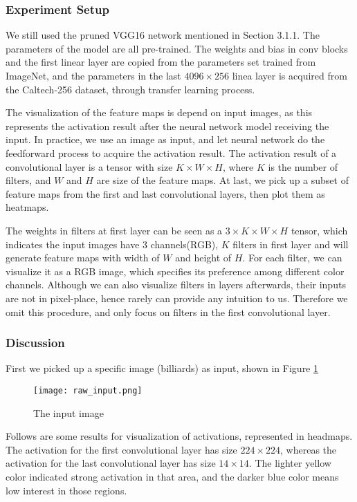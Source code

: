 \subsubsection{Experiment Setup}
We still used the pruned VGG16 network mentioned in Section 3.1.1. The parameters of the model are all pre-trained. The weights and bias in conv blocks and the first linear layer are copied from the parameters set trained from ImageNet, and the parameters in the last $4096\times 256$ linea layer is acquired from the Caltech-256 dataset, through transfer learning process.

The visualization of the feature maps is depend on input images, as this represents the activation result after the neural network model receiving the input. In practice, we use an image as input, and let neural network do the feedforward process to acquire the activation result. The activation result of a convolutional layer is a tensor with size $K \times W\times H$, where $K$ is the number of filters, and $W$ and $H$ are size of the feature maps. At last, we pick up a subset of feature maps from the first and last convolutional layers, then plot them as heatmaps.

The weights in filters at first layer can be seen as a $3\times K \times W \times H$ tensor, which indicates the input images have 3 channels(RGB), $K$ filters in first layer and will generate feature maps with width of $W$ and height of $H$. For each filter, we can visualize it as a RGB image, which specifies its preference among different color channels. Although we can also visualize filters in layers afterwards, their inputs are not in pixel-place, hence rarely can provide any intuition to us. Therefore we omit this procedure, and only focus on filters in the first convolutional layer.

\subsubsection{Discussion}
First we picked up a specific image (billiards) as input, shown in Figure \ref{fig-input}

\begin{figure}[H]
  \centering
\texttt{[image: raw\_input.png]}
  \caption{The input image}
  \label{fig-input}
\end{figure}

Follows are some results for visualization of activations, represented in headmaps. The activation for the first convolutional layer has size $224\times 224$, whereas the activation for the last convolutional layer has size $14\times 14$. The lighter yellow color indicated strong activation in that area, and the darker blue color means low interest in those regions.


